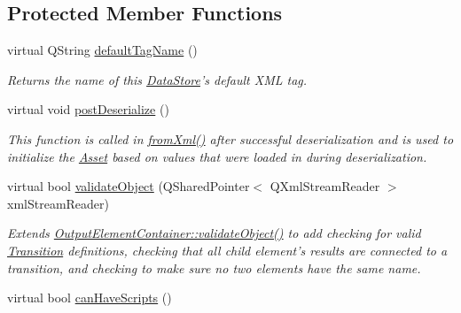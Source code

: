 \subsection*{Protected Member Functions}
\begin{DoxyCompactItemize}
\item 
virtual Q\-String \hyperlink{class_picto_1_1_state_machine_a97b7fe78eab6d54c1e8c3d6a932fc73e}{default\-Tag\-Name} ()
\begin{DoxyCompactList}\small\item\em Returns the name of this \hyperlink{class_picto_1_1_data_store}{Data\-Store}'s default X\-M\-L tag. \end{DoxyCompactList}\item 
virtual void \hyperlink{class_picto_1_1_state_machine_a3b28ab6e5310ea16c2dbb19d6e071f80}{post\-Deserialize} ()
\begin{DoxyCompactList}\small\item\em This function is called in \hyperlink{class_picto_1_1_asset_a8bed4da09ecb1c07ce0dab313a9aba67}{from\-Xml()} after successful deserialization and is used to initialize the \hyperlink{class_picto_1_1_asset}{Asset} based on values that were loaded in during deserialization. \end{DoxyCompactList}\item 
\hypertarget{class_picto_1_1_state_machine_a0f52f44365e6b7ba4e5c4ff92e092208}{virtual bool \hyperlink{class_picto_1_1_state_machine_a0f52f44365e6b7ba4e5c4ff92e092208}{validate\-Object} (Q\-Shared\-Pointer$<$ Q\-Xml\-Stream\-Reader $>$ xml\-Stream\-Reader)}\label{class_picto_1_1_state_machine_a0f52f44365e6b7ba4e5c4ff92e092208}

\begin{DoxyCompactList}\small\item\em Extends \hyperlink{class_picto_1_1_output_element_container_a19905a70272fa330d195ed51bfca1a16}{Output\-Element\-Container\-::validate\-Object()} to add checking for valid \hyperlink{class_picto_1_1_transition}{Transition} definitions, checking that all child element's results are connected to a transition, and checking to make sure no two elements have the same name. \end{DoxyCompactList}\item 
\hypertarget{class_picto_1_1_state_machine_a7555b512672af5a860678825d8b03ec3}{virtual bool \hyperlink{class_picto_1_1_state_machine_a7555b512672af5a860678825d8b03ec3}{can\-Have\-Scripts} ()}\label{class_picto_1_1_state_machine_a7555b512672af5a860678825d8b03ec3}


\end{DoxyCompactItemize}
